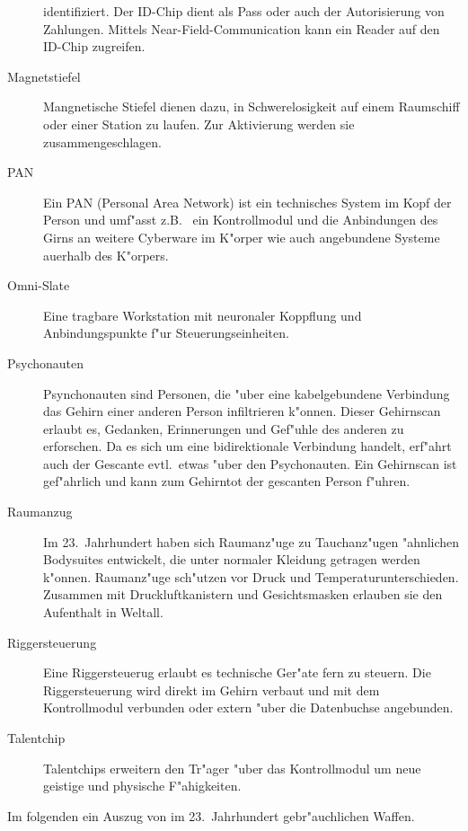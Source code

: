 \begin{description}
      identifiziert. Der ID-Chip dient als Pass oder auch der Autorisierung von Zahlungen. Mittels Near-Field-Communication kann ein Reader auf den ID-Chip zugreifen.
\item [Magnetstiefel] Mangnetische Stiefel dienen dazu, in Schwerelosigkeit auf einem Raumschiff oder einer Station zu
      laufen. Zur Aktivierung werden sie zusammengeschlagen.
\item[PAN] Ein PAN (Personal Area Network) ist ein technisches System im Kopf der Person und umf"asst z.B.~ ein Kontrollmodul und   
      die Anbindungen des Girns an weitere Cyberware im K"orper wie auch angebundene Systeme au\3erhalb des K"orpers.
\item[Omni-Slate] Eine tragbare Workstation mit neuronaler Koppflung und Anbindungspunkte f"ur Steuerungseinheiten.
\item [Psychonauten] Psynchonauten sind Personen, die "uber eine kabelgebundene Verbindung das Gehirn
      einer anderen Person infiltrieren k"onnen. Dieser Gehirnscan erlaubt es, Gedanken, Erinnerungen und Gef"uhle des anderen zu erforschen. Da es sich um eine bidirektionale Verbindung handelt, erf"ahrt auch der Gescante evtl.~etwas "uber den Psychonauten. Ein Gehirnscan ist gef"ahrlich und kann zum Gehirntot der gescanten Person f"uhren.
\item [Raumanzug] Im 23.~Jahrhundert haben sich Raumanz"uge zu Tauchanz"ugen "ahnlichen Bodysuites entwickelt, die unter
      normaler Kleidung getragen werden k"onnen. Raumanz"uge sch"utzen vor Druck und Temperaturunterschieden. Zusammen mit Druckluftkanistern und Gesichtsmasken erlauben sie den Aufenthalt in Weltall.
\item [Riggersteuerung] Eine Riggersteuerug erlaubt es technische Ger"ate fern zu steuern. Die Riggersteuerung wird direkt im 
      Gehirn verbaut und mit dem Kontrollmodul verbunden oder extern "uber die Datenbuchse angebunden.
\item[Talentchip] Talentchips erweitern den Tr"ager "uber das Kontrollmodul um neue geistige und physische F"ahigkeiten. 
\end{description}


Im folgenden ein Auszug von im 23.~Jahrhundert gebr"auchlichen Waffen.


